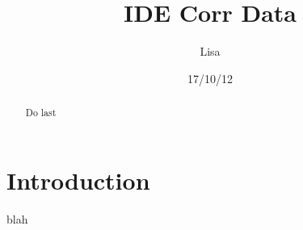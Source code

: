 \documentclass[12pt]{article}
\theoremstyle{definition}
\theoremstyle{remark}
\numberwithin{equation}{section}
\begin{document}
\title{IDE Corr Data}%
\author{Lisa}%

\date{17/10/12}%
\begin{abstract}
  Do last
\end{abstract}
\maketitle
\section{Introduction}

blah
\end{document}
